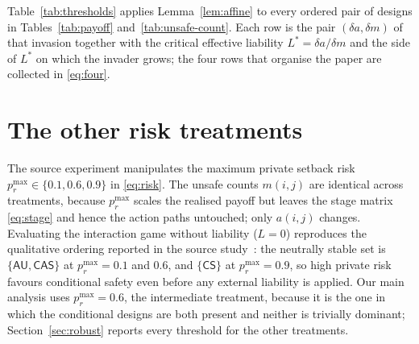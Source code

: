 \documentclass[11pt,a4paper]{article}
\theoremstyle{definition}
\newcommand{\AU}{\textsf{AU}}
\newcommand{\CS}{\textsf{CS}}
\newcommand{\CAS}{\textsf{CAS}}
\begin{document}
Table~\ref{tab:thresholds} applies Lemma~\ref{lem:affine} to every ordered
pair of designs in Tables~\ref{tab:payoff} and~\ref{tab:unsafe-count}. Each
row is the pair $(\delta a,\delta m)$ of that invasion together with the
critical effective liability $L^{*}=\delta a/\delta m$ and the side of
$L^{*}$ on which the invader grows; the four rows that organise the paper are
collected in \eqref{eq:four}.



\section{The other risk treatments}\label{app:treatments}

The source experiment manipulates the maximum private setback risk
$p_r^{\max}\in\{0.1,0.6,0.9\}$ in \eqref{eq:risk}. The unsafe counts $m(i,j)$
are identical across treatments, because $p_r^{\max}$ scales the realised
payoff but leaves the stage matrix \eqref{eq:stage} and hence the action paths
untouched; only $a(i,j)$ changes. Evaluating the interaction game without
liability ($L=0$) reproduces the qualitative ordering reported in the source
study~\citep{domingos2026falling}: the neutrally stable set is
$\{\AU,\CAS\}$ at $p_r^{\max}=0.1$ and $0.6$, and $\{\CS\}$ at
$p_r^{\max}=0.9$, so high private risk favours conditional safety even before
any external liability is applied. Our main analysis uses $p_r^{\max}=0.6$,
the intermediate treatment, because it is the one in which the conditional
designs are both present and neither is trivially dominant;
Section~\ref{sec:robust} reports every threshold for the other treatments.



\end{document}
